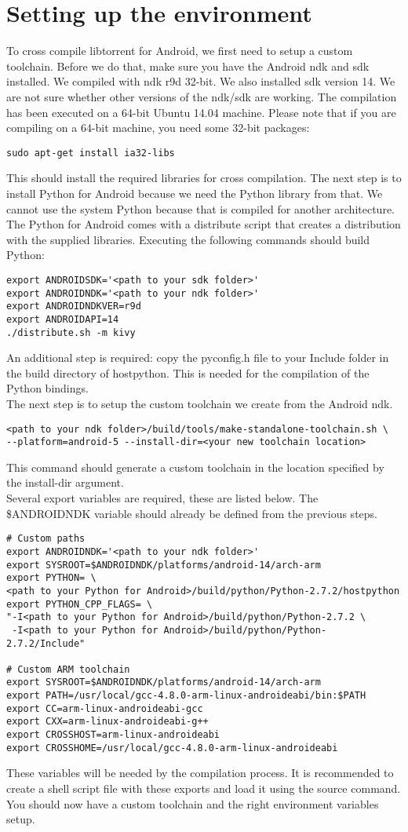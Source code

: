 \section{Setting up the environment}
	To cross compile libtorrent for Android, we first need to setup a custom toolchain. Before we do that, make sure you have the Android ndk and sdk installed. We compiled with ndk r9d 32-bit. We also installed sdk version 14. We are not sure whether other versions of the ndk/sdk are working. The compilation has been executed on a 64-bit Ubuntu 14.04 machine. Please note that if you are compiling on a 64-bit machine, you need some 32-bit packages:
	\begin{lstlisting}
sudo apt-get install ia32-libs
	\end{lstlisting}
	This should install the required libraries for cross compilation. The next step is to install Python for Android because we need the Python library from that. We cannot use the system Python because that is compiled for another architecture. The Python for Android comes with a distribute script that creates a distribution with the supplied libraries. Executing the following commands should build Python:
	\begin{lstlisting}
export ANDROIDSDK='<path to your sdk folder>'
export ANDROIDNDK='<path to your ndk folder>'
export ANDROIDNDKVER=r9d
export ANDROIDAPI=14
./distribute.sh -m kivy
	\end{lstlisting}
	An additional step is required: copy the pyconfig.h file to your Include folder in the build directory of hostpython. This is needed for the compilation of the Python bindings.\\
	The next step is to setup the custom toolchain we create from the Android ndk.
	\begin{lstlisting}
<path to your ndk folder>/build/tools/make-standalone-toolchain.sh \
--platform=android-5 --install-dir=<your new toolchain location>
	\end{lstlisting}
	This command should generate a custom toolchain in the location specified by the install-dir argument.\\
	Several export variables are required, these are listed below. The \$ANDROIDNDK variable should already be defined from the previous steps.
	\begin{lstlisting}
# Custom paths
export ANDROIDNDK='<path to your ndk folder>'
export SYSROOT=$ANDROIDNDK/platforms/android-14/arch-arm
export PYTHON= \ 
<path to your Python for Android>/build/python/Python-2.7.2/hostpython
export PYTHON_CPP_FLAGS= \
"-I<path to your Python for Android>/build/python/Python-2.7.2 \
 -I<path to your Python for Android>/build/python/Python-2.7.2/Include"
	 
# Custom ARM toolchain
export SYSROOT=$ANDROIDNDK/platforms/android-14/arch-arm
export PATH=/usr/local/gcc-4.8.0-arm-linux-androideabi/bin:$PATH
export CC=arm-linux-androideabi-gcc
export CXX=arm-linux-androideabi-g++
export CROSSHOST=arm-linux-androideabi
export CROSSHOME=/usr/local/gcc-4.8.0-arm-linux-androideabi
	\end{lstlisting}
	These variables will be needed by the compilation process. It is recommended to create a shell script file with these exports and load it using the source command.\\
	You should now have a custom toolchain and the right environment variables setup.